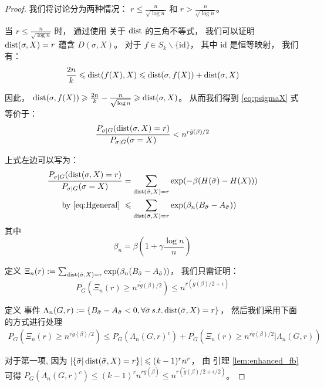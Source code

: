 \begin{proof}
  我们将讨论分为两种情况： $r\leq \frac{n}{\sqrt{\log n}}$
  和 $r > \frac{n}{\sqrt{\log n}}$。
  
  当 $r\leq \frac{n}{\sqrt{\log n}}$ 时，
  通过使用 关于 $\operatorname{dist}$
  的三角不等式，
  我们可以证明 
  $\operatorname{dist}(\sigma, X) = r$ 蕴含
  $D(\sigma, X)$。
   对于 $f \in S_k \backslash \{ \textrm{id} \}$，
   其中
   $\textrm{id}$ 是恒等映射，
   我们有：
  $$
  \frac{2n}{k} \leqslant \operatorname{dist}(f(X), X) \leqslant \operatorname{dist}(\sigma, f(X)) + \operatorname{dist}(\sigma, X)
  $$
  
  因此，
  $\operatorname{dist}(\sigma, f(X)) \geqslant \frac{2n}{k} - \frac{n}{\sqrt{\log n}} \geqslant \operatorname{dist}(\sigma, X)$。
  从而我们得到
  \eqref{eq:psigmaX} 式 等价于：
  \begin{equation}\label{eq:psigmaX2}
  \frac{P_{\sigma|G}(\operatorname{dist}(\sigma, X)=r)}
  {P_{\sigma|G}(\sigma=X)} <
  n^{r \tilde{g}(\beta) /2}
  \end{equation}
  
  上式左边可以写为：
  \begin{align*}
  \frac{P_{\sigma|G}(\Dist(\sigma, X)=r)}
  {P_{\sigma|G}(\sigma=X)}  &= \sum_{\Dist(\bar{\sigma}, X)=r}\exp(-\beta(H(\bar{\sigma})-H(X)))\\
  \textrm{ by \eqref{eq:Hgeneral} } &\leq \sum_{\Dist(\bar{\sigma}, X)=r}\exp(\beta_n(B_{\bar{\sigma}}-A_{\bar{\sigma}}))
  \end{align*}
  其中 
  \begin{equation}\label{eq:beta_n_def}
  \beta_n = \beta(1+\gamma\frac{\log n}{n})
  \end{equation}
  
  定义
  $\Xi_n(r): = \sum_{\operatorname{dist}(\bar{\sigma}, X)=r}\exp(\beta_n(B_{\bar{\sigma}}-A_{\bar{\sigma}}))$，
  我们只需证明：
  \begin{equation}
  P_{G}(\Xi_n(r) \geq n^{r \tilde{g}(\beta) /2}) \leq  n^{r (\tilde{g}(\beta) /2 + \epsilon)}
  \end{equation}
  
  定义 事件 $\Lambda_n(G,r):=\{B_{\bar{\sigma}} -A_{\bar{\sigma}} < 0, \forall \bar{\sigma}\, s.t. \operatorname{dist}(\bar{\sigma}, X)=r\}$，
  然后我们采用下面的方式进行处理
  \begin{align*}
  P_{G}(\Xi_n(r) \geq n^{r \tilde{g}(\beta) /2}) \leq
  P_G(\Lambda_n(G,r)^c)
  + P_G\left(
    \Xi_n(r) \geq n^{r \tilde{g}(\beta) /2} |\Lambda_n(G,r) 
    \right)
  \end{align*}
  
  对于第一项, 因为
  $|\{ \bar{\sigma} | \operatorname{dist}(\bar{\sigma}, X) = r \}| \leqslant (k-1)^r n^r$，
  由 引理 \ref{lem:enhanced_fb} 可得
  $P_G(\Lambda_n(G,r)^c) \leq (k-1)^r n^{rg(\bar{\beta})} \leq n^{r (\tilde{g}(\beta) /2 + \epsilon/2)}$。


\end{proof}
